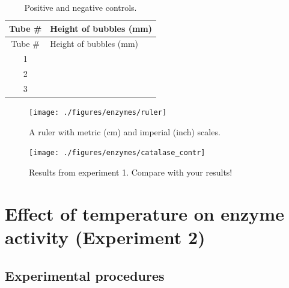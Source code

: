 \documentclass[]{book}
\begin{document}
\begin{longtable}[]{@{}cl@{}}
\caption{\label{tab:control} Positive and negative controls.}\tabularnewline
\toprule
Tube \# & Height of bubbles (mm)\tabularnewline
\midrule
\endfirsthead
\toprule
Tube \# & Height of bubbles (mm)\tabularnewline
\midrule
\endhead
1 &\tabularnewline
2 &\tabularnewline
3 &\tabularnewline
\bottomrule
\end{longtable}

\begin{figure}

{\centering \texttt{[image: ./figures/enzymes/ruler]} 

}

\caption{A ruler with metric (cm) and imperial (inch) scales.}\label{fig:ruler}
\end{figure}

\begin{figure}

{\centering \texttt{[image: ./figures/enzymes/catalase\_contr]} 

}

\caption{Results from experiment 1. Compare with your results!}\label{fig:contr}
\end{figure}

\hypertarget{effect-of-temperature-on-enzyme-activity-experiment-2}{%
\section{Effect of temperature on enzyme activity (Experiment 2)}\label{effect-of-temperature-on-enzyme-activity-experiment-2}}

\hypertarget{experimental-procedures-21}{%
\subsection{Experimental procedures}\label{experimental-procedures-21}}
\end{document}
